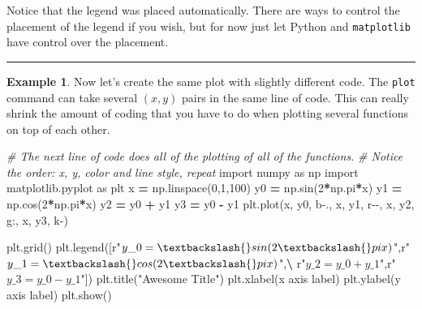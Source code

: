 \documentclass[
]{book}
\newenvironment{Shaded}{\begin{snugshade}}{\end{snugshade}}
\newcommand{\CommentTok}[1]{\textcolor[rgb]{0.56,0.35,0.01}{\textit{#1}}}
\newcommand{\DecValTok}[1]{\textcolor[rgb]{0.00,0.00,0.81}{#1}}
\newcommand{\ImportTok}[1]{#1}
\newcommand{\NormalTok}[1]{#1}
\newcommand{\OperatorTok}[1]{\textcolor[rgb]{0.81,0.36,0.00}{\textbf{#1}}}
\newcommand{\StringTok}[1]{\textcolor[rgb]{0.31,0.60,0.02}{#1}}
\newcommand{\VerbatimStringTok}[1]{\textcolor[rgb]{0.31,0.60,0.02}{#1}}
\theoremstyle{definition}
\theoremstyle{definition}
\newtheorem{example}{Example}[chapter]
\theoremstyle{definition}
\theoremstyle{remark}
\begin{document}
Notice that the legend was placed automatically. There are ways to control the placement of the legend if you wish, but for now just let Python and \texttt{matplotlib} have control over the placement.

\begin{center}\rule{0.5\linewidth}{0.5pt}\end{center}

\begin{example}
\protect\hypertarget{exm:unnamed-chunk-758}{}{\label{exm:unnamed-chunk-758} }Now let's create the same plot with slightly different code. The \texttt{plot} command can take several \((x, y)\) pairs in the same line of code. This can really shrink the amount of coding that you have to do when plotting several functions on top of each other.
\end{example}

\begin{Shaded}
\begin{Highlighting}[]
\CommentTok{\# The next line of code does all of the plotting of all of the functions.}
\CommentTok{\# Notice the order: x, y, color and line style, repeat}
\ImportTok{import}\NormalTok{ numpy }\ImportTok{as}\NormalTok{ np}
\ImportTok{import}\NormalTok{ matplotlib.pyplot }\ImportTok{as}\NormalTok{ plt}
\NormalTok{x }\OperatorTok{=}\NormalTok{ np.linspace(}\DecValTok{0}\NormalTok{,}\DecValTok{1}\NormalTok{,}\DecValTok{100}\NormalTok{)}
\NormalTok{y0 }\OperatorTok{=}\NormalTok{ np.sin(}\DecValTok{2}\OperatorTok{*}\NormalTok{np.pi}\OperatorTok{*}\NormalTok{x)}
\NormalTok{y1 }\OperatorTok{=}\NormalTok{ np.cos(}\DecValTok{2}\OperatorTok{*}\NormalTok{np.pi}\OperatorTok{*}\NormalTok{x)}
\NormalTok{y2 }\OperatorTok{=}\NormalTok{ y0 }\OperatorTok{+}\NormalTok{ y1}
\NormalTok{y3 }\OperatorTok{=}\NormalTok{ y0 }\OperatorTok{{-}}\NormalTok{ y1}
\NormalTok{plt.plot(x, y0, }\StringTok{\textquotesingle{}b{-}.\textquotesingle{}}\NormalTok{, x, y1, }\StringTok{\textquotesingle{}r{-}{-}\textquotesingle{}}\NormalTok{, x, y2, }\StringTok{\textquotesingle{}g:\textquotesingle{}}\NormalTok{, x, y3, }\StringTok{\textquotesingle{}k{-}\textquotesingle{}}\NormalTok{)}

\NormalTok{plt.grid()}
\NormalTok{plt.legend([}\VerbatimStringTok{r"$y\_0 = \textbackslash{}sin(2\textbackslash{}pi x)$"}\NormalTok{,}\VerbatimStringTok{r"$y\_1 = \textbackslash{}cos(2\textbackslash{}pi x)$"}\NormalTok{,}\OperatorTok{\textbackslash{}}
            \VerbatimStringTok{r"$y\_2 = y\_0 + y\_1$"}\NormalTok{,}\VerbatimStringTok{r"$y\_3 = y\_0 {-} y\_1$"}\NormalTok{])}
\NormalTok{plt.title(}\StringTok{"Awesome Title"}\NormalTok{)}
\NormalTok{plt.xlabel(}\StringTok{\textquotesingle{}x axis label\textquotesingle{}}\NormalTok{)}
\NormalTok{plt.ylabel(}\StringTok{\textquotesingle{}y axis label\textquotesingle{}}\NormalTok{)}
\NormalTok{plt.show()}
\end{Highlighting}
\end{Shaded}
\end{document}

